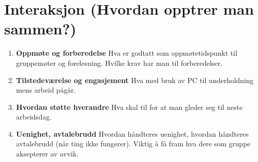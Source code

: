 \section*{Interaksjon (Hvordan opptrer man sammen?)}
\begin{enumerate}[label=\Alph*.]
    \item \textbf{Oppmøte og forberedelse}  
    Hva er godtatt som oppmøtetidspunkt til gruppemøter og forelesning. Hvilke krav har man til forberedelser.

    \item \textbf{Tilstedeværelse og engasjement}  
    Hva med bruk av PC til underholdning mens arbeid pågår.

    \item \textbf{Hvordan støtte hverandre}  
    Hva skal til for at man gleder seg til neste arbeidsdag.

    \item \textbf{Uenighet, avtalebrudd}  
    Hvordan håndteres uenighet, hvordan håndteres avtalebrudd (når ting ikke fungerer). Viktig å få fram hva dere som gruppe aksepterer av avvik.
\end{enumerate}


